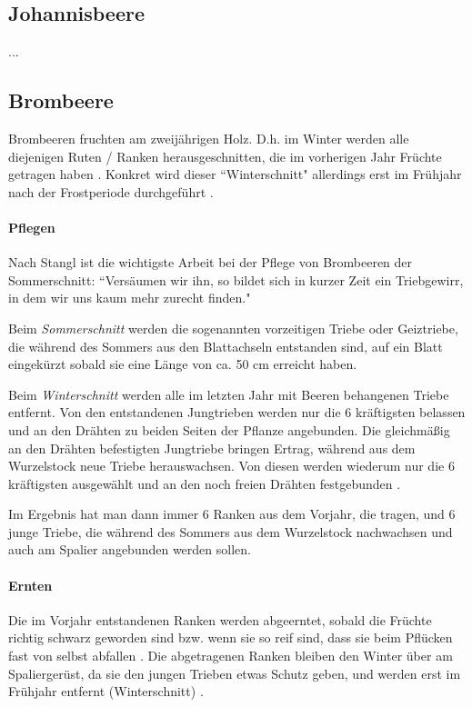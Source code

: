 \subsection{Johannisbeere}
...

\subsection{Brombeere}
\label{Brombeere}

Brombeeren fruchten am zweijährigen Holz.
D.h. im Winter werden alle diejenigen Ruten / Ranken herausgeschnitten, die im vorherigen Jahr Früchte getragen haben \cite[S.~176]{Seymour1978}.
Konkret wird dieser ``Winterschnitt" allerdings erst im Frühjahr nach der Frostperiode durchgeführt \cite[S.~196]{Stangl1995}.

\paragraph{Pflegen}

Nach Stangl \cite[S.~196]{Stangl1995} ist die wichtigste Arbeit bei der Pflege von Brombeeren der Sommerschnitt:
``Versäumen wir ihn, so bildet sich in kurzer Zeit ein Triebgewirr, in dem wir uns kaum mehr zurecht finden."

Beim \textit{Sommerschnitt} werden die sogenannten vorzeitigen Triebe oder Geiztriebe, die während des Sommers aus den Blattachseln entstanden sind, auf ein Blatt eingekürzt sobald sie eine Länge von ca. 50 cm erreicht haben.

Beim \textit{Winterschnitt} werden alle im letzten Jahr mit Beeren behangenen Triebe entfernt.
Von den entstandenen Jungtrieben werden nur die 6 kräftigsten belassen und an den Drähten zu beiden Seiten der Pflanze angebunden.
Die gleichmäßig an den Drähten befestigten Jungtriebe bringen Ertrag, während aus dem Wurzelstock neue Triebe herauswachsen.
Von diesen werden wiederum nur die 6 kräftigsten ausgewählt und an den noch freien Drähten festgebunden \cite[S.~197]{Stangl1995}.

Im Ergebnis hat man dann immer 6 Ranken aus dem Vorjahr, die tragen, und 6 junge Triebe, die während des Sommers aus dem Wurzelstock nachwachsen und auch am Spalier angebunden werden sollen.

\paragraph{Ernten}

Die im Vorjahr entstandenen Ranken werden abgeerntet, sobald die Früchte richtig schwarz geworden sind bzw. wenn sie so reif sind, dass sie beim Pflücken fast von selbst abfallen \cite[S.~176]{Seymour1978}.
Die abgetragenen Ranken bleiben den Winter über am Spaliergerüst, da sie den jungen Trieben etwas Schutz geben, und werden erst im Frühjahr entfernt (\textrightarrow Winterschnitt) \cite[S.~197]{Stangl1995}.

